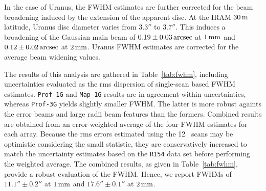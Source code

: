 In the case of Uranus, the
FWHM estimates are further corrected for the beam broadening induced
by the extension of the apparent disc. At the IRAM $30\,\rm{m}$
latitude, Uranus disc diameter varies from $3.3''$ to $3.7''$. This
induces a broadening of the Gaussian main beam of
$0.19 \pm 0.03\,\rm{arcsec}$ at $1\, \rm{mm}$ and $0.12 \pm 0.02\,\rm{arcsec}$
at $2\, \rm{mm}$. Uranus FWHM estimates are corrected for the average beam
widening values.

The results of this analysis are
gathered in Table~\ref{tab:fwhm}, including uncertainties evaluated as
the rms dispersion of single-scan based FWHM estimates.
{\tt Prof-1G} and {\tt Map-1G} results are in agreement within
uncertainties, whereas {\tt Prof-3G} yields slightly smaller FWHM.
{\lp The latter is more robust againts the error beams and large radii
beam features than the formers.}
Combined results are obtained from an error-weighted
average of the four FWHM estimates for each array.
Because the rms errors estimated using the 12 \bm\ scans may be
optimistic considering the small statistic, they are conservatively
increased to match the uncertainty estimates based on the {\tt R154}
data set before performing the weighted average.  
The combined results, as given in
Table~\ref{tab:fwhm}, provide a robust evaluation of the
FWHM. Hence, we report FWHMs of $11.1'' \pm 0.2''$ at
$1\, \rm{mm}$ and $17.6''\pm 0.1''$ at $2\, \rm{mm}$.  

